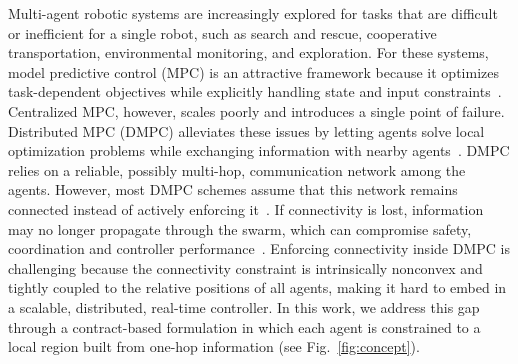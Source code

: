 \documentclass[letterpaper, 10 pt, conference]{ieeeconf}  %
\begin{document}
Multi-agent robotic systems are increasingly explored for tasks that are difficult or inefficient for a single robot, such as search and rescue, cooperative
transportation, environmental monitoring, and exploration. For these systems,
model predictive control (MPC) is an attractive framework because it optimizes
task-dependent objectives while explicitly handling state and input
constraints~\cite{negenborn2009multi}. Centralized MPC, however, scales poorly and introduces a single point of failure. Distributed MPC (DMPC) alleviates these issues by letting agents solve
local optimization problems while exchanging information with nearby
agents~\cite{scattolini2009architectures,muller2017economic,conte2016distributed,boyd2011distributed}.
DMPC relies on a reliable, possibly multi-hop, communication network among the agents. However, most DMPC schemes assume that this network remains connected instead of actively enforcing it~\cite{conte2016distributed}. If connectivity
is lost, information may no longer propagate through the swarm, which can
compromise safety, coordination and controller
performance~\cite{jadbabaie2003coordination,olfati2004consensus,fax2004information}.
Enforcing connectivity inside DMPC is challenging because the connectivity constraint is intrinsically nonconvex and tightly coupled to the relative positions of all agents, making it hard to embed in a scalable, distributed, real-time controller. In this work, we address this gap through a contract-based formulation in which each agent is constrained to a local region built from one-hop information (see Fig.~\ref{fig:concept}).
\end{document}
